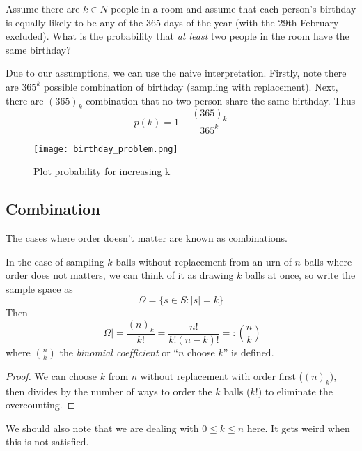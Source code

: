\documentclass[11pt]{article}
\begin{document}
\begin{exercise}
  Assume there are \(k \in N\) people in a room and assume that each person’s birthday is equally likely to be any of the 365 days of the year (with the 29th February excluded). What is the probability that \emph{at least} two people in the room have the same birthday?
\end{exercise}
\begin{solution}
  Due to our assumptions, we can use the naive interpretation. Firstly, note there are \(365^k\) possible combination of birthday (sampling with replacement). Next, there are \((365)_k\) combination that no two person share the same birthday. Thus \[p(k) = 1 - \frac{(365)_k}{365^k}\]
\end{solution}
\begin{figure}[ht]
  \texttt{[image: birthday\_problem.png]}
  \centering
  \caption{Plot probability for increasing k}
\end{figure}  

\subsection{Combination}
The cases where order doesn't matter are known as combinations.

\begin{theorem}
  In the case of sampling \(k\) balls without replacement from an urn of \(n\) balls where order does not matters, we can think of it as drawing \(k\) balls at once, so write the sample space as
  \[\Omega=\{s\in S:|s|=k\}\]
  Then \[|\Omega|=\frac{(n)_k}{k!}=\frac{n!}{k!(n-k)!}=:\binom{n}{k}\]
  where \(\binom{n}{k}\) the \emph{binomial coefficient} or ``\(n\) choose \(k\)'' is defined.
\end{theorem}
\begin{proof}
  We can choose \(k\) from \(n\) without replacement with order first (\((n)_k\)), then divides by the number of ways to order the \(k\) balls (\(k!\)) to eliminate the overcounting.
\end{proof}

We should also note that we are dealing with \(0\leq k\leq n\) here. It gets weird when this is not satisfied.
\end{document}

